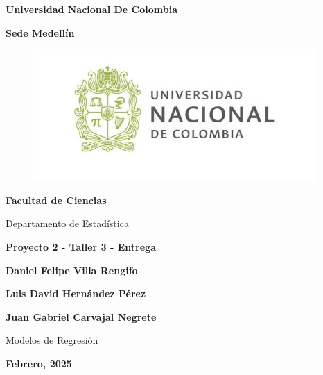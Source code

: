 \begin{titlepage}
    \begin{center}
        {\LARGE \textbf{Universidad Nacional De Colombia}} \\
        
        \vspace{4mm}
        
        {\Large \textbf{Sede Medellín}}
        \vspace{0.3cm}
        \begin{figure}[h]
            \centering
        \includegraphics[height=5cm]{logo.jpg}
        \end{figure}
    
    \vspace{1mm}
    
    {\LARGE \textbf{Facultad de Ciencias}}
    \vspace{5mm}
    
    {\Large Departamento de Estadística}
    \vspace{1.4cm}

    {\LARGE\textbf{Proyecto 2 - Taller 3 - Entrega}}
    \vspace{1.4cm}    
    
    {\Large \textbf{Daniel Felipe Villa Rengifo}}
    \vspace{4mm}
    
    {\Large \textbf{Luis David Hernández Pérez}}
    \vspace{4mm}
    
    {\Large \textbf{Juan Gabriel Carvajal Negrete}}
    \vspace{1.4cm}
    
    {\Large Modelos de Regresión}
    \vspace{0.5cm}
    
    {\Large\textbf{Febrero, 2025}}

    \end{center}
\end{titlepage}

